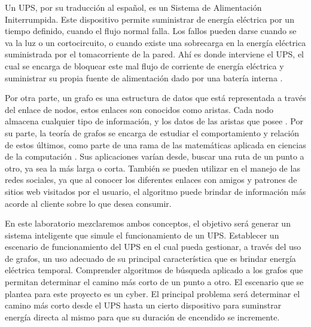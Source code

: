 \documentclass[runningheads]{llncs}
\begin{document}


        Un UPS, por su traducción al español, es un Sistema de Alimentación Initerrumpida. Este dispositivo permite suministrar de energía eléctrica por un tiempo definido, cuando el flujo normal falla. Los fallos pueden darse cuando se va la luz o un cortocircuito, o cuando existe una sobrecarga en la energía eléctrica suministrada por el tomacorriente de la pared. Ahí es donde interviene el UPS, el cual se encarga de bloquear este mal flujo de corriente de energía eléctrica y suministrar su propia fuente de alimentación dado por una batería interna \cite{ups_definicion}.

        Por otra parte, un grafo es una estructura de datos que está representada a través del enlace de nodos, estos enlaces son conocidos como aristas. Cada nodo almacena cualquier tipo de información, y los datos de las aristas que posee \cite{grafo_definicion}. Por su parte, la teoría de grafos se encarga de estudiar el comportamiento y relación de estos últimos, como parte de una rama de las matemáticas aplicada en ciencias de la computación \cite{teoria_grafos_definicion}. Sus aplicaciones varían desde, buscar una ruta de un punto a otro, ya sea la más larga o corta. También se pueden utilizar en el manejo de las redes sociales, ya que al conocer los diferentes enlaces con amigos y patrones de sitios web visitados por el usuario, el algoritmo puede brindar de información más acorde al cliente sobre lo que desea consumir.

        En este laboratorio mezclaremos ambos conceptos, el objetivo será generar un sistema inteligente que simule el funcionamiento de un UPS. Establecer un escenario de funcionamiento del UPS en el cual pueda gestionar, a través del uso de grafos, un uso adecuado de su principal característica que es brindar energía eléctrica temporal. Comprender algoritmos de búsqueda aplicado a los grafos que permitan determinar el camino más corto de un punto a otro. El escenario que se plantea para este proyecto es un cyber. El principal problema será determinar el camino más corto desde el UPS hasta un cierto dispositivo para suminstrar energía directa al mismo para que su duración de encendido se incremente.
        
\end{document}
